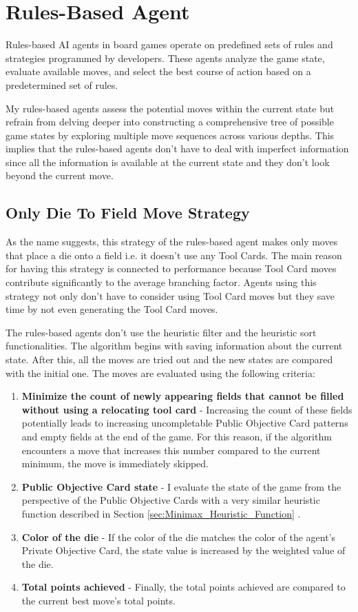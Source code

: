 \chapter{Rules-Based Agent}

Rules-based AI agents in board games operate on predefined sets of rules and strategies programmed by developers. These agents analyze the game state, 
evaluate available moves, and select the best course of action based on a predetermined set of rules. 


My rules-based agents assess the potential moves within the current state but refrain from delving deeper into constructing a comprehensive tree of 
possible game states by exploring multiple move sequences across various depths. This implies that the rules-based agents don't have to deal with
imperfect information since all the information is available at the current state and they don't look beyond the current move.


\section{Only Die To Field Move Strategy}

As the name suggests, this strategy of the rules-based agent makes only moves that place a die onto a field i.e. it doesn't use any Tool Cards.
The main reason for having this strategy is connected to performance because Tool Card moves contribute significantly to the average branching factor.
Agents using this strategy not only don't have to consider using Tool Card moves but they save time by not even generating the Tool Card moves.

The rules-based agents don't use the heuristic filter and the heuristic sort functionalities. The algorithm begins
with saving information about the current state. After this, all the moves are tried out and the new states are compared with the initial one. The 
moves are evaluated using the following criteria:
\begin{enumerate}
    \item \textbf{Minimize the count of newly appearing fields that cannot be filled without using a relocating tool card} - Increasing the count of these fields potentially 
    leads to increasing uncompletable Public Objective Card patterns and empty fields at the end of the game. For this reason, if the algorithm encounters a move that increases
    this number compared to the current minimum, the move is immediately skipped.
    \item \textbf{Public Objective Card state} - I evaluate the state of the game from the perspective of the Public Objective Cards with a very similar heuristic function
    described in Section \ref{sec:Minimax_Heuristic_Function} .
    \item \textbf{Color of the die} - If the color of the die matches the color of the agent's Private Objective Card, the state value is increased by the weighted value
    of the die.
    \item \textbf{Total points achieved} - Finally, the total points achieved are compared to the current best move's total points.
\end{enumerate} 

